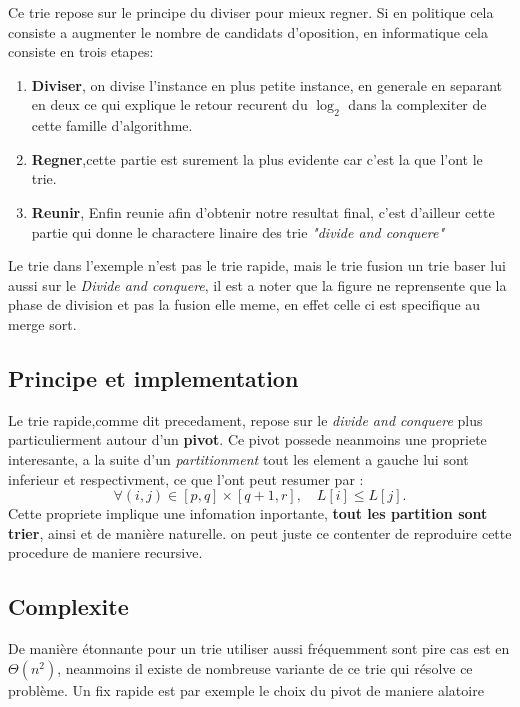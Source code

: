 \documentclass[French,Hoar.tex]{subfiles}
\begin{document}
  Ce trie repose sur le principe du diviser pour mieux regner. Si en politique cela consiste a augmenter le nombre
  de candidats d'oposition, en informatique cela consiste en trois etapes:
  \begin{enumerate}
    \item \textbf{\color{Nred}Diviser}, on divise l'instance en plus petite instance, en generale en separant en deux ce qui
      explique le retour recurent du $\log_2$ dans la complexiter de cette famille d'algorithme.
    \item \textbf{\color{Nred}Regner},cette partie est surement la plus evidente car c'est la que l'ont le trie.
    \item \textbf{\color{Nred}Reunir}, Enfin reunie afin d'obtenir notre resultat final, c'est d'ailleur cette
    partie qui donne le charactere linaire des trie \emph{"divide and conquere"}
  \end{enumerate}
    Le trie dans l'exemple n'est pas le trie rapide, mais le trie fusion un trie baser lui aussi sur le \emph{Divide and 
    conquere}, il est a noter que la figure ne reprensente que la phase de division et pas la fusion elle meme, en effet celle 
    ci est specifique au merge sort.

  \subsection{Principe et implementation}
  Le trie rapide,comme dit precedament, repose sur le \emph{divide and conquere} plus particulierment autour d'un \textbf{\color{nred}pivot}.
  Ce pivot possede neanmoins une propriete interesante, a la suite d'un \emph{partitionment} tout les element a gauche lui sont inferieur et respectivment, ce que l'ont peut resumer par :
  $$
    \forall (i,j)\in[p,q]\times[q+1,r],\quad L[i] \leq L[j].
  $$
  Cette propriete implique une infomation inportante, \textbf{tout les partition sont trier}, ainsi et de manière naturelle.
  on peut juste ce contenter de reproduire cette procedure de maniere recursive.
  
  \subsection{Complexite}
  De manière étonnante pour un trie utiliser aussi fréquemment sont pire cas est en $\Theta(n^2)$, neanmoins il existe
  de nombreuse variante de ce trie qui résolve ce problème. Un fix rapide est par exemple le choix du pivot de maniere al\e atoire
\end{document}
